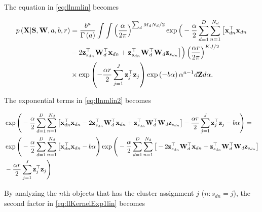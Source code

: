 \documentclass[]{article}
\newcommand{\Z}{\boldsymbol{\mathrm{Z}}}
\newcommand{\gammaA}{\Gamma\left(a\right)}
\newcommand{\Scluster}{\mathbf{S}}
\newcommand{\WIn}{\mathbf{W}}
\newcommand{\indobj}{\mathbf{x}_{dn}}
\newcommand{\projMatI}{\mathbf{W}_d}
\newcommand{\lvecI}{\mathbf{z}_j}
\newcommand{\lvecsI}{\mathbf{z}_{s_{dn}}}
\begin{document}
The equation in \eqref{eq:llnmlin} becomes

\begin{align}
p\left(\mathbf{X}|\Scluster,\WIn,a,b,r\right) &= \frac{b^a}{\gammaA}\int \int \left(\frac{\alpha}{2\pi}\right)^{\sum_d M_d N_d /2}\exp\Big(-\frac{\alpha}{2} \sum_{d=1}^{D}\sum_{n=1}^{N_d}\big[ \indobj^\top \indobj  \notag\\
&  - 2 \lvecsI ^\top \projMatI^\top \indobj + \lvecsI^\top \projMatI^\top \projMatI \lvecsI \big]\Big)\left(\frac{\alpha r}{2\pi}\right)^{KJ/2} \notag \\
&\times \exp\left(-\frac{\alpha r}{2} \sum_{j=1}^{J}\lvecI^\top\lvecI\right)\exp\left(-b\alpha\right)\alpha^{a-1}d\Z d\alpha.
\label{eq:llnmlin2}
\end{align}

The exponential terms in \eqref{eq:llnmlin2} becomes

\begin{align}
&\exp\Bigg(-\frac{\alpha}{2} \sum_{d=1}^{D}\sum_{n=1}^{N_d}\big[ \indobj^\top \indobj-2 \lvecsI ^\top \projMatI^\top \indobj + \lvecsI^\top \projMatI^\top \projMatI \lvecsI\big]-\frac{\alpha r}{2} \sum_{j=1}^{J}\lvecI^\top\lvecI -b\alpha\Bigg) = \notag\\
& \exp\Bigg(-\frac{\alpha}{2} \sum_{d=1}^{D}\sum_{n=1}^{N_d}\big[ \indobj^\top \indobj-b\alpha\Bigg)\exp\Bigg(-\frac{\alpha}{2} \sum_{d=1}^{D}\sum_{n=1}^{N_d}\big[ -2 \lvecsI ^\top \projMatI^\top \indobj+\lvecsI^\top \projMatI^\top \projMatI \lvecsI\big] \notag\\
&-\frac{\alpha r}{2} \sum_{j=1}^{J}\lvecI^\top\lvecI\Bigg) \label{eq:llKernelExp1lin}
\end{align}

By analyzing the $n$th objects that has the cluster assignment $j$ ($n:s_{dn}=j$), the second factor in \eqref{eq:llKernelExp1lin} becomes
\end{document}
